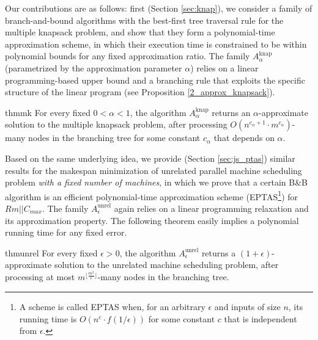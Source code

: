 \documentclass[a4paper,UKenglish,cleveref, autoref, thm-restate, pdfa]{lipics-v2021}
\theoremstyle{plain}
\begin{document}
\bigskip

Our contributions are as follows: first (Section \ref{sec:knap}), we consider a family of branch-and-bound algorithms with the best-first tree traversal rule for the multiple knapsack problem, and show that they form a polynomial-time approximation scheme, in which their execution time is constrained to be within polynomial bounds for any fixed approximation ratio. The family $A^{\text{knap}}_{\alpha}$ (parametrized by the approximation parameter $\alpha$) relies on a linear programming-based upper bound and a branching rule that exploits the specific structure of the linear program (see Proposition \ref{2_approx_knapsack}).

\begin{restatable*}{thm}{mk}\label{multi_knapsack_ptas}
    For every fixed $0< \alpha < 1$, the algorithm $A^{\text{knap}}_{\alpha}$ returns an $\alpha$-approximate solution to the multiple knapsack problem, after processing $O(n^{c_{\alpha}+1} \cdot m^{c_{\alpha}})$-many nodes in the branching tree for some constant $c_{\alpha}$ that depends on $\alpha$.
\end{restatable*}

Based on the same underlying idea, we provide (Section \ref{sec:js_ptas}) similar results for the makespan minimization of unrelated parallel machine scheduling problem \emph{with a fixed number of machines}, in which we prove that a certain B\&B algorithm is an efficient polynomial-time approximation scheme (EPTAS\footnote{A scheme is called EPTAS when, for an arbitrary $\epsilon$ and inputs of size $n$, its running time is $O(n^c \cdot f(1/\epsilon))$ for some constant $c$ that is independent from $\epsilon$.}) for $Rm||C_{max}$. The family $A^{\text{unrel}}_{\epsilon}$ again relies on a linear programming relaxation and its approximation property. The following theorem  easily implies a polynomial running time for any fixed error.

\begin{restatable*}{thm}{unrel}\label{unrel_machine_ptas}
    For every fixed $\epsilon > 0$, the algorithm $A^{\text{unrel}}_{\epsilon}$ returns a $(1+\epsilon)$-approximate solution to the unrelated machine scheduling problem, after processing at most $m^{\lfloor\frac{m^2}{\epsilon}\rfloor}$-many nodes in the branching tree.
\end{restatable*}
\end{document}
